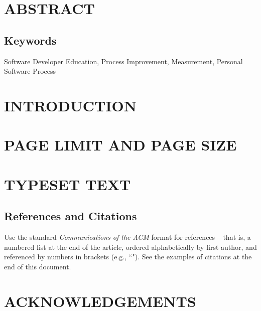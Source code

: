 \section*{ABSTRACT}

\subsection{Keywords}
Software Developer Education, Process Improvement, Measurement, Personal Software Process

\section{INTRODUCTION}

\section{PAGE LIMIT AND PAGE SIZE}

\section{TYPESET TEXT}

\subsection{References and Citations}
Use the standard {\it Communications of the ACM} format for 
references -- that is, a numbered list at the end of the 
article, ordered alphabetically by first author, and referenced 
by numbers in brackets (e.g., ``\cite{Ackerman90}").
See the examples of citations at 
the end of this document.

\section*{ACKNOWLEDGEMENTS}



%



